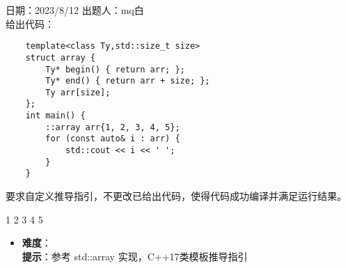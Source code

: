 日期：2023/8/12 出题人：mq白\\

给出代码：

\begin{verbatim}
    template<class Ty,std::size_t size>
    struct array {
        Ty* begin() { return arr; };
        Ty* end() { return arr + size; };
        Ty arr[size];
    };
    int main() {
        ::array arr{1, 2, 3, 4, 5};
        for (const auto& i : arr) {
            std::cout << i << ' ';
        }
    }
\end{verbatim}

要求自定义推导指引，不更改已给出代码，使得代码成功编译并满足运行结果。

\begin{tcolorbox}[title = {要求运行结果},
    fonttitle = \bfseries, fontupper = \sffamily, fontlower = \itshape]
    1 2 3 4 5 
\end{tcolorbox}

\begin{itemize}
    \item \textbf{难度}：  \\
    \textbf{提示}：参考 std::array 实现，C++17类模板推导指引
\end{itemize}